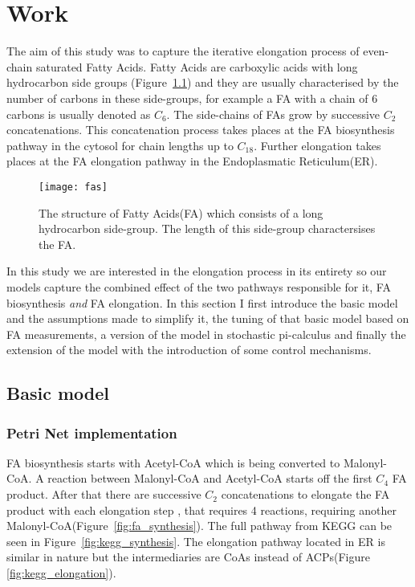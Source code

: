 

\chapter{Work}
\label{chap:work}
\ifpdf
    \graphicspath{{Chapter3/Figs/Raster/}{Chapter3/Figs/PDF/}{Chapter3/Figs/}}
\else
    \graphicspath{{Chapter3/Figs/Vector/}{Chapter3/Figs/}}
\fi

The aim of this study was to capture the iterative elongation process
of even-chain saturated Fatty Acids. Fatty Acids are
carboxylic acids with long hydrocarbon side groups
(Figure~\ref{fig:fas}) and they are usually characterised by the
number of carbons in these side-groups, for example a FA with a chain
of 6 carbons is usually denoted as $C_6$. The side-chains of FAs grow
by successive $C_2$ concatenations. This concatenation process takes places at
the FA biosynthesis pathway in the cytosol for chain lengths up to
$C_{18}$. Further elongation takes places at the FA elongation
pathway in the Endoplasmatic Reticulum(ER).

\begin{figure}[htbp!]
\centering
\texttt{[image: fas]}
\caption[Fatty Acid structure]{The structure of Fatty Acids(FA) which
  consists of a long hydrocarbon side-group. The length of this
  side-group charactersises the FA.}
\label{fig:fas}
\end{figure}

In this study we are interested in the elongation process in its
entirety so our models capture the combined effect of the two pathways
responsible for it, FA biosynthesis \textit{and} FA elongation. In
this section I first introduce the basic model and the assumptions
made to simplify it, the tuning of that basic model based on FA
measurements, a version of the model in stochastic pi-calculus and
finally the extension of the model with the introduction of some
control mechanisms.

\section{Basic model}
\subsection{Petri Net implementation}
FA biosynthesis starts with Acetyl-CoA which is being converted to
Malonyl-CoA. A reaction between Malonyl-CoA and Acetyl-CoA starts off
the first $C_4$ FA product. After that there are successive $C_2$
concatenations to elongate the FA product with each elongation step
, that requires 4 reactions, requiring another Malonyl-CoA(Figure~\ref{fig:fa_synthesis}). The
full pathway from KEGG can be seen in
Figure~\ref{fig:kegg_synthesis}. The elongation pathway located in ER
is similar in nature but the intermediaries are CoAs instead of
ACPs(Figure \ref{fig:kegg_elongation}).

